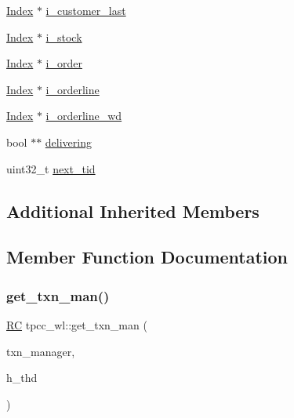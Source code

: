 \begin{DoxyCompactItemize}
\hyperlink{classIndex}{Index} $\ast$ \hyperlink{classtpcc__wl_aa6cc66486a485184ffffbc89b8583b19}{i\+\_\+customer\+\_\+last}
\item 
\hyperlink{classIndex}{Index} $\ast$ \hyperlink{classtpcc__wl_a8927cb7293d11150e2717d9c0782b9a1}{i\+\_\+stock}
\item 
\hyperlink{classIndex}{Index} $\ast$ \hyperlink{classtpcc__wl_ae778282544ed75f8b85b3d7a4edf0dfc}{i\+\_\+order}
\item 
\hyperlink{classIndex}{Index} $\ast$ \hyperlink{classtpcc__wl_afc13c1efcceb358d84970ebdf43ad0ce}{i\+\_\+orderline}
\item 
\hyperlink{classIndex}{Index} $\ast$ \hyperlink{classtpcc__wl_a2b55a2cda169c0213e572cd23a258c04}{i\+\_\+orderline\+\_\+wd}
\item 
bool $\ast$$\ast$ \hyperlink{classtpcc__wl_aed8e979c419bcd6c656f10ba744da75b}{delivering}
\item 
uint32\+\_\+t \hyperlink{classtpcc__wl_a01db97a665638486d45e3cdc7462dc6d}{next\+\_\+tid}
\end{DoxyCompactItemize}
\subsection*{Additional Inherited Members}


\subsection{Member Function Documentation}
\mbox{\label{classtpcc__wl_a7794924fd334984a429b43e151ad040a}} 
\subsubsection{\texorpdfstring{get\+\_\+txn\+\_\+man()}{get\_txn\_man()}}
{\footnotesize\ttfamily \hyperlink{global_8h_a78c49a674c810fdd03d20432f7be864a}{RC} tpcc\+\_\+wl\+::get\+\_\+txn\+\_\+man (\begin{DoxyParamCaption}\item[{\hyperlink{classtxn__man}{txn\+\_\+man} $\ast$\&}]{txn\+\_\+manager,  }\item[{\hyperlink{classthread__t}{thread\+\_\+t} $\ast$}]{h\+\_\+thd }\end{DoxyParamCaption})\hspace{0.3cm}{\ttfamily [virtual]}}



